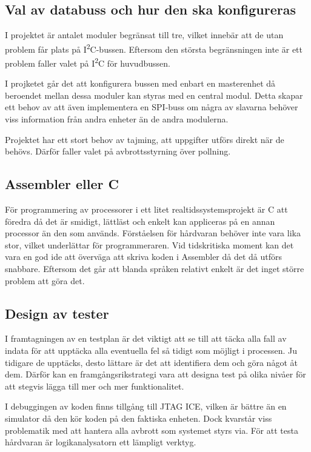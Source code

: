 \documentclass[11pt]{article}
\begin{document}
\begin{flushleft}
\subsection{Val av databuss och hur den ska konfigureras}
I projektet är antalet moduler begränsat till tre, vilket innebär att de utan problem får plats på I\textsuperscript{2}C-bussen. Eftersom den största begränsningen inte är ett problem faller valet på I\textsuperscript{2}C för huvudbussen. 

I projketet går det att konfigurera bussen med enbart en masterenhet då beroendet mellan dessa moduler kan styras med en central modul. Detta skapar ett behov av att även implementera en SPI-buss om några av slavarna behöver viss information från andra enheter än de andra modulerna. 

Projektet har ett stort behov av tajming, att uppgifter utförs direkt när de behövs. Därför faller valet på avbrottsstyrning över pollning.

\subsection{Assembler eller C}

För programmering av processorer i ett litet realtidssystemsprojekt är C att föredra då det är smidigt, lättläst och enkelt kan appliceras på en annan processor än den som används. Förståelsen för hårdvaran behöver inte vara lika stor, vilket underlättar för programmeraren. Vid tidskritiska moment kan det vara en god ide att överväga att skriva koden i Assembler då det då utförs snabbare. Eftersom det går att blanda språken relativt enkelt är det inget större problem att göra det.

\subsection{Design av tester}
I framtagningen av en testplan är det viktigt att se till att täcka alla fall av indata för att upptäcka alla eventuella fel så tidigt som möjligt i processen. Ju tidigare de upptäcks, desto lättare är det att identifiera dem och göra något åt dem. Därför kan en framgångsrikstrategi vara att designa test på olika nivåer för att stegvis lägga till mer och mer funktionalitet.

I debuggingen av koden finns tillgång till JTAG ICE, vilken är bättre än en simulator då den kör koden på den faktiska enheten. Dock kvarstår viss problematik med att hantera alla avbrott som systemet styrs via. För att testa hårdvaran är logikanalysatorn ett lämpligt verktyg.


\end{flushleft}
\end{document}
